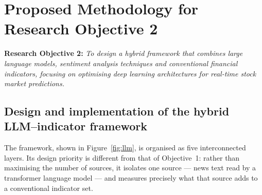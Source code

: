 \section{Proposed Methodology for Research Objective 2}

\textbf{Research Objective 2:} \emph{To design a hybrid framework that combines large
language models, sentiment analysis techniques and conventional financial indicators,
focusing on optimising deep learning architectures for real-time stock market
predictions.}

\subsection{Design and implementation of the hybrid LLM--indicator framework}

The framework, shown in Figure~\ref{fig:llm}, is organised as five interconnected layers.
Its design priority is different from that of Objective~1: rather than maximising the
number of sources, it isolates one source --- news text read by a transformer language
model --- and measures precisely what that source adds to a conventional indicator set.

